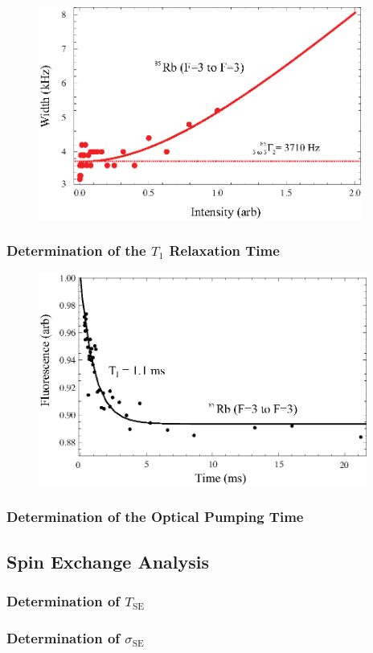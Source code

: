 \begin{figure}[htbp]
\begin{center}
\includegraphics[height=70mm]{./figures/intensity_width.eps}
\caption{\small{}}
\label{fig:}
\end{center}
\end{figure}

\subsubsection{Determination of the $T_{1}$ Relaxation Time}

\begin{figure}[htbp]
\begin{center}
\includegraphics[height=70mm]{./figures/T1.eps}
\caption{\small{}}
\label{fig:}
\end{center}
\end{figure}

\subsubsection{Determination of the Optical Pumping Time}

\subsection{Spin Exchange Analysis}

\subsubsection{Determination of $T_{\mathrm{SE}}$}

\subsubsection{Determination of $\sigma_{\mathrm{SE}}$}